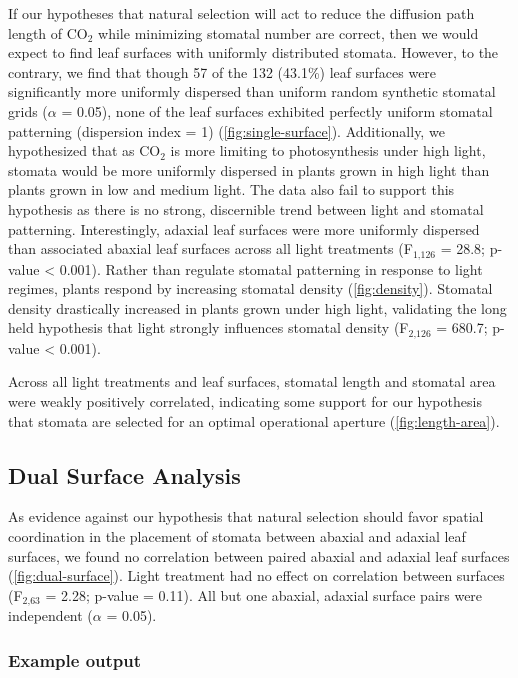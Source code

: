 \documentclass[12pt,halfline,a4paper,]{ouparticle}
\begin{document}
If our hypotheses that natural selection will act to reduce the
diffusion path length of CO\(_2\) while minimizing stomatal number are
correct, then we would expect to find leaf surfaces with uniformly
distributed stomata. However, to the contrary, we find that though 57 of
the 132 (43.1\%) leaf surfaces were significantly more uniformly
dispersed than uniform random synthetic stomatal grids (\(\alpha\) =
0.05), none of the leaf surfaces exhibited perfectly uniform stomatal
patterning (dispersion index = 1) (\autoref{fig:single-surface}).
Additionally, we hypothesized that as CO\(_2\) is more limiting to
photosynthesis under high light, stomata would be more uniformly
dispersed in plants grown in high light than plants grown in low and
medium light. The data also fail to support this hypothesis as there is
no strong, discernible trend between light and stomatal patterning.
Interestingly, adaxial leaf surfaces were more uniformly dispersed than
associated abaxial leaf surfaces across all light treatments
(F\(_\text{1,126}\) = 28.8; p-value \textless{} 0.001). Rather than
regulate stomatal patterning in response to light regimes, plants
respond by increasing stomatal density (\autoref{fig:density}). Stomatal
density drastically increased in plants grown under high light,
validating the long held hypothesis that light strongly influences
stomatal density (F\(_\text{2,126}\) = 680.7; p-value \textless{}
0.001).

Across all light treatments and leaf surfaces, stomatal length and
stomatal area were weakly positively correlated, indicating some support
for our hypothesis that stomata are selected for an optimal operational
aperture (\autoref{fig:length-area}).

\hypertarget{dual-surface-analysis}{%
\subsection{Dual Surface Analysis}\label{dual-surface-analysis}}

As evidence against our hypothesis that natural selection should favor
spatial coordination in the placement of stomata between abaxial and
adaxial leaf surfaces, we found no correlation between paired abaxial
and adaxial leaf surfaces (\autoref{fig:dual-surface}). Light treatment
had no effect on correlation between surfaces (F\(_\text{2,63}\) = 2.28;
p-value = 0.11). All but one abaxial, adaxial surface pairs were
independent (\(\alpha\) = 0.05).

\hypertarget{example-output}{%
\subsubsection{Example output}\label{example-output}}
\end{document}
